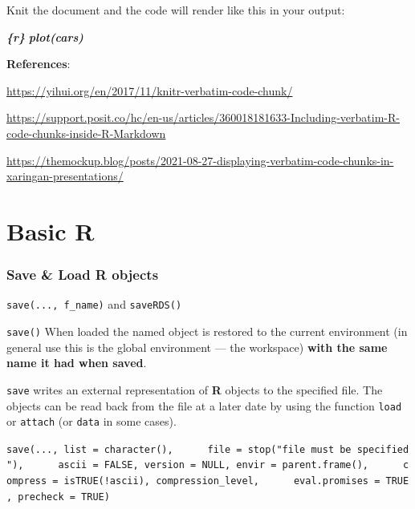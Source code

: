 \documentclass[
]{book}
\newenvironment{Shaded}{\begin{snugshade}}{\end{snugshade}}
\newcommand{\InformationTok}[1]{\textcolor[rgb]{0.56,0.35,0.01}{\textbf{\textit{#1}}}}
\begin{document}
Knit the document and the code will render like this in your output:

\begin{Shaded}
\begin{Highlighting}[]
\InformationTok{\textasciigrave{}\textasciigrave{}\textasciigrave{}\{r\}}
\InformationTok{plot(cars)}
\InformationTok{\textasciigrave{}\textasciigrave{}\textasciigrave{}}
\end{Highlighting}
\end{Shaded}

\textbf{References}:

\url{https://yihui.org/en/2017/11/knitr-verbatim-code-chunk/}

\url{https://support.posit.co/hc/en-us/articles/360018181633-Including-verbatim-R-code-chunks-inside-R-Markdown}

\url{https://themockup.blog/posts/2021-08-27-displaying-verbatim-code-chunks-in-xaringan-presentations/}

\chapter{Basic R}\label{basic-r}

\subsection*{Save \& Load R objects}\label{save-load-r-objects}

\texttt{save(...,\ f\_name)} and \texttt{saveRDS()}

\texttt{save()} When loaded the named object is restored to the current environment (in general use this is the global environment --- the workspace) \textbf{with the same name it had when saved}.

\texttt{save} writes an external representation of \textbf{R} objects to the specified file. The objects can be read back from the file at a later date by using the function \texttt{load} or \texttt{attach} (or \texttt{data} in some cases).

\texttt{save(...,\ list\ =\ character(),\ \ \ \ \ \ file\ =\ stop("\textquotesingle{}file\textquotesingle{}\ must\ be\ specified"),\ \ \ \ \ \ ascii\ =\ FALSE,\ version\ =\ NULL,\ envir\ =\ parent.frame(),\ \ \ \ \ \ compress\ =\ isTRUE(!ascii),\ compression\_level,\ \ \ \ \ \ eval.promises\ =\ TRUE,\ precheck\ =\ TRUE)}
\end{document}
